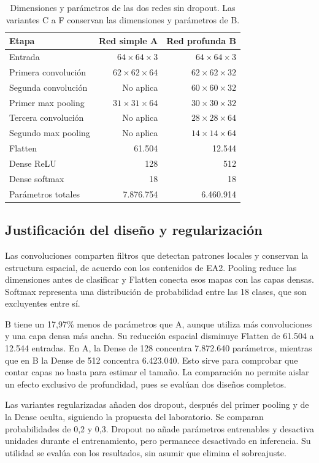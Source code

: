 \documentclass[11pt,letterpaper]{article}
\begin{document}
\begin{table}[H]
\centering\small
\begin{tabular}{lrr}
\toprule
Etapa & Red simple A & Red profunda B \\
\midrule
Entrada & $64\times64\times3$ & $64\times64\times3$ \\
Primera convolución & $62\times62\times64$ & $62\times62\times32$ \\
Segunda convolución & No aplica & $60\times60\times32$ \\
Primer max pooling & $31\times31\times64$ & $30\times30\times32$ \\
Tercera convolución & No aplica & $28\times28\times64$ \\
Segundo max pooling & No aplica & $14\times14\times64$ \\
Flatten & 61.504 & 12.544 \\
Dense ReLU & 128 & 512 \\
Dense softmax & 18 & 18 \\
\midrule
Parámetros totales & 7.876.754 & 6.460.914 \\
\bottomrule
\end{tabular}
\caption{Dimensiones y parámetros de las dos redes sin dropout. Las variantes C a F conservan las dimensiones y parámetros de B.}
\label{tab:arquitecturas}
\end{table}

\subsection{Justificación del diseño y regularización}
Las convoluciones comparten filtros que detectan patrones locales y conservan la estructura espacial, de acuerdo con los contenidos de EA2. Pooling reduce las dimensiones antes de clasificar y Flatten conecta esos mapas con las capas densas. Softmax representa una distribución de probabilidad entre las 18 clases, que son excluyentes entre sí.

B tiene un 17,97\% menos de parámetros que A, aunque utiliza más convoluciones y una capa densa más ancha. Su reducción espacial disminuye Flatten de 61.504 a 12.544 entradas. En A, la Dense de 128 concentra 7.872.640 parámetros, mientras que en B la Dense de 512 concentra 6.423.040. Esto sirve para comprobar que contar capas no basta para estimar el tamaño. La comparación no permite aislar un efecto exclusivo de profundidad, pues se evalúan dos diseños completos.

Las variantes regularizadas añaden dos dropout, después del primer pooling y de la Dense oculta, siguiendo la propuesta del laboratorio. Se comparan probabilidades de 0,2 y 0,3. Dropout no añade parámetros entrenables y desactiva unidades durante el entrenamiento, pero permanece desactivado en inferencia. Su utilidad se evalúa con los resultados, sin asumir que elimina el sobreajuste.
\end{document}
